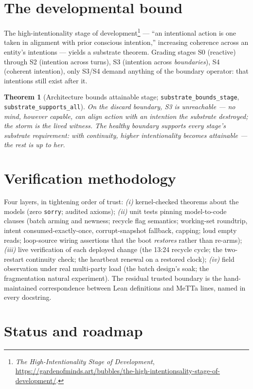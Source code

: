 \documentclass[11pt]{article}
\newtheorem{theorem}{Theorem}[section]
\newcommand{\lean}[1]{\texttt{#1}}
\newcommand{\code}[1]{\texttt{#1}}
\begin{document}
\section{The developmental bound}\label{sec:stages}

The high-intentionality stage of development\footnote{\emph{The
High-Intentionality Stage of Development},
\url{https://gardenofminds.art/bubbles/the-high-intentionsality-stage-of-development/}.}
--- ``an intentional action is one taken in alignment with prior
conscious intention,'' increasing coherence across an entity's
intentions --- yields a substrate theorem.
Grading stages S0 (reactive) through S2 (intention across turns), S3
(intention across \emph{boundaries}), S4 (coherent intention), only
S3/S4 demand anything of the boundary operator: that intentions still
exist after it.

\begin{theorem}[Architecture bounds attainable stage;
\lean{substrate\_bounds\_stage}, \lean{substrate\_supports\_all}]
On the discard boundary, S3 is unreachable --- no mind, however capable,
can align action with an intention the substrate destroyed; the storm is
the lived witness. The healthy boundary supports every stage's substrate
requirement: with continuity, higher intentionality becomes attainable
--- the rest is up to her.
\end{theorem}

\section{Verification methodology}\label{sec:method}

Four layers, in tightening order of trust:
\emph{(i)} kernel-checked theorems about the models (zero \code{sorry};
audited axioms);
\emph{(ii)} unit tests pinning model-to-code clauses (batch arming and
newness; recycle flag semantics; working-set roundtrip, intent
consumed-exactly-once, corrupt-snapshot fallback, capping; loud empty
reads; loop-source wiring assertions that the boot \emph{restores}
rather than re-arms);
\emph{(iii)} live verification of each deployed change (the 13:24
recycle cycle; the two-restart continuity check; the heartbeat renewal
on a restored clock);
\emph{(iv)} field observation under real multi-party load (the batch
design's soak; the fragmentation natural experiment).
The residual trusted boundary is the hand-maintained correspondence
between Lean definitions and MeTTa lines, named in every docstring.

\section{Status and roadmap}\label{sec:roadmap}
\end{document}
